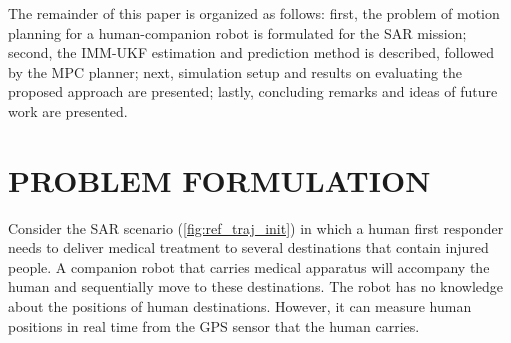 \documentclass[letterpaper, 10 pt, conference]{ieeeconf}
\newcommand{\todohere}[1]{\hl{(\textbf{TODO:} #1)}}
\begin{document}
	
	The remainder of this paper is organized as follows:
	first, the problem of motion planning for a human-companion robot is formulated for the SAR mission;
	second, the IMM-UKF estimation and prediction method is described, followed by the MPC planner;
	next, simulation setup and results on evaluating the proposed approach are presented; 
	lastly, concluding remarks and ideas of future work are presented.
	
	
	
	\section{PROBLEM FORMULATION}\label{sec:formulation}
	Consider the SAR scenario (\cref{fig:ref_traj_init}) in which a human first responder needs to deliver medical treatment to several destinations that contain injured people. 
	A companion robot that carries medical apparatus will accompany the human and sequentially move to these destinations.
	The robot has no knowledge about the positions of human destinations.
	However, it can measure human positions in real time from the GPS sensor that the human carries.
	
\end{document}
